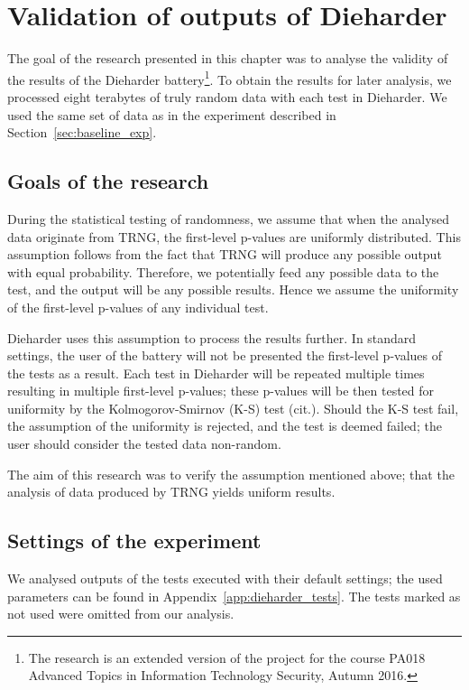 \documentclass[
  digital,  	%
  color,		%
  oneside,   	%
  12pt,
  nocover,
  notable,
  nolof,
  nolot,
]{fithesis3}
\theoremstyle{definition}
\theoremstyle{remark}
\begin{document}
\chapter{Validation of outputs of Dieharder}
\label{chap:validating_dieharder}
The goal of the research presented in this chapter was to analyse the validity of the results of the Dieharder battery\footnote{The research is an extended version of the project for the course PA018 Advanced Topics in Information Technology Security, Autumn 2016.}. To obtain the results for later analysis, we processed eight terabytes of truly random data with each test in Dieharder. We used the same set of data as in the experiment described in Section~\ref{sec:baseline_exp}.

\section{Goals of the research}
During the statistical testing of randomness, we assume that when the analysed data originate from TRNG, the first-level p-values are uniformly distributed. This assumption follows from the fact that TRNG will produce any possible output with equal probability. Therefore, we potentially feed any possible data to the test, and the output will be any possible results. Hence we assume the uniformity of the first-level p-values of any individual test.

Dieharder uses this assumption to process the results further. In standard settings, the user of the battery will not be presented the first-level p-values of the tests as a result. Each test in Dieharder will be repeated multiple times resulting in multiple first-level p-values; these p-values will be then tested for uniformity by the Kolmogorov-Smirnov (K-S) test (cit.). Should the K-S test fail, the assumption of the uniformity is rejected, and the test is deemed failed; the user should consider the tested data non-random.

The aim of this research was to verify the assumption mentioned above; that the analysis of data produced by TRNG yields uniform results.

\section{Settings of the experiment}
We analysed outputs of the tests executed with their default settings; the used parameters can be found in Appendix~\ref{app:dieharder_tests}. The tests marked as not used were omitted from our analysis.
\end{document}
